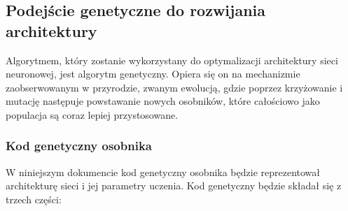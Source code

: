 \subsection{Podejście genetyczne do rozwijania architektury}
Algorytmem, który zostanie wykorzystany do optymalizacji
architektury sieci neuronowej, jest algorytm genetyczny.
Opiera się on na mechanizmie zaobserwowanym w przyrodzie,
zwanym ewolucją, gdzie poprzez krzyżowanie i mutację
następuje powstawanie nowych osobników,
które całościowo jako populacja są coraz lepiej przystosowane.

\subsubsection{Kod genetyczny osobnika}
W niniejszym dokumencie kod genetyczny osobnika będzie reprezentował
architekturę sieci i jej parametry uczenia.
Kod genetyczny będzie składał się z trzech części:

